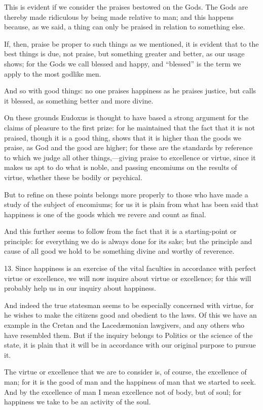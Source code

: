 This is evident if we consider the praises bestowed on the Gods. The
Gods are thereby made ridiculous by being made relative to man; and
this happens because, as we said, a thing can only be praised in
relation to something else.

If, then, praise be proper to such things as we mentioned, it is
evident that to the best things is due, not praise, but something
greater and better, as our usage shows; for the Gods we call blessed
and happy, and ``blessed'' is the term we apply to the most godlike
men.

And so with good things: no one praises happiness as he praises
justice, but calls it blessed, as something better and more divine.

On these grounds Eudoxus is thought to have based a strong argument
for the claims of pleasure to the first prize: for he maintained that
the fact that it is not praised, though it is a good thing, shows that
it is higher than the goods we praise, as God and the good are higher;
for these are the standards by reference to which we judge all other
things,---giving praise to excellence or virtue, since it makes us apt
to do what is noble, and passing encomiums on the results of virtue,
whether these be bodily or psychical.

But to refine on these points belongs more properly to those who have
made a study of the subject of encomiums; for us it is plain from what
has been said that happiness is one of the goods which we revere and
count as final.

And this further seems to follow from the fact that it is a
starting-point or principle: for everything we do is always done for
its sake; but the principle and cause of all good we hold to be
something divine and worthy of reverence.

13. Since happiness is an exercise of the vital faculties in
accordance with perfect virtue or excellence, we will now inquire
about virtue or excellence; for this will probably help us in our
inquiry about happiness.

And indeed the true statesman seems to be especially concerned with
virtue, for he wishes to make the citizens good and obedient to the
laws. Of this we have an example in the Cretan and the Laced\ae monian
lawgivers, and any others who have resembled them. But if the inquiry
belongs to Politics or the science of the state, it is plain that it
will be in accordance with our original purpose to pursue it.

The virtue or excellence that we are to consider is, of course, the
excellence of man; for it is the good of man and the happiness of man
that we started to seek. And by the excellence of man I mean
excellence not of body, but of soul; for happiness we take to be an
activity of the soul.

